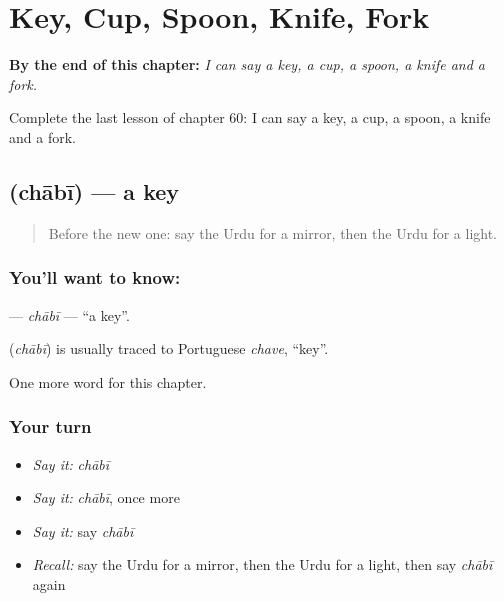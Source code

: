 
\chapter{Key, Cup, Spoon, Knife, Fork}
\label{ch:ur-key-cup-spoon-knife-fork}

\begin{chapteropening}
\textbf{By the end of this chapter:} \emph{I can say a key, a cup, a spoon, a knife and a fork.}

Complete the last lesson of chapter 60: I can say a key, a cup, a spoon, a knife and a fork.
\end{chapteropening}

\section[\texorpdfstring{\ur{چابی} (chābī)}{چابی (chābī)}]{ (chābī) — a key}

\label{lesson:UR-C60-chabi}



\begin{quote}
Before the new one: say the Urdu for a mirror, then the Urdu for a light.
\end{quote}

\subsection*{You'll want to know: }
\textbf{} — \emph{chābī} — \textquotedblleft{}a key\textquotedblright{}.

\begin{cousinweb}
\textbf{} (\emph{chābī}) is usually traced to Portuguese \emph{chave}, \textquotedblleft{}key\textquotedblright{}.
\end{cousinweb}

\begin{grammarlens}[title={What you've built}]
One more word for this chapter.
\end{grammarlens}

\subsection*{Your turn}
\begin{itemize}
\raggedright
  \item \emph{Say it:} \emph{chābī}
  \item \emph{Say it:} \emph{chābī}, once more
  \item \emph{Say it:} say \emph{chābī}
  \item \emph{Recall:} say the Urdu for a mirror, then the Urdu for a light, then say \emph{chābī} again
\end{itemize}

